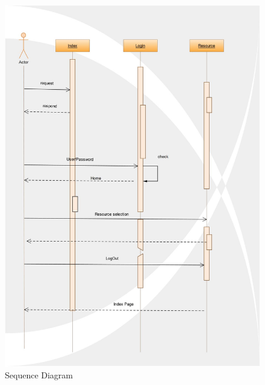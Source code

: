 \documentclass[12pt,a4paper,final,oneside]{report}
\begin{document}
	\begin{figure}
		\centering \vfill	\includegraphics[totalheight=0.9\textheight,angle=0]
		{seq1.jpg}
		\caption{Sequence Diagram}
	\end{figure}
\end{document}
